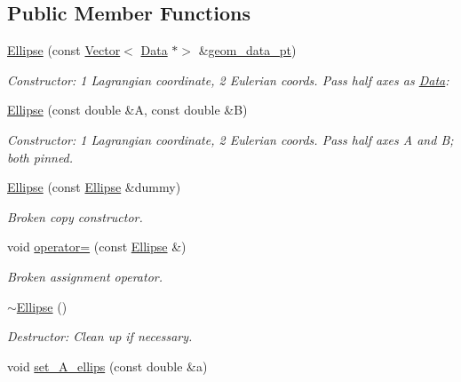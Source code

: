 \subsection*{Public Member Functions}
\begin{DoxyCompactItemize}
\item 
\hyperlink{classoomph_1_1Ellipse_a6fa5158011b34942ea014f8106e86786}{Ellipse} (const \hyperlink{classoomph_1_1Vector}{Vector}$<$ \hyperlink{classoomph_1_1Data}{Data} $\ast$$>$ \&\hyperlink{classoomph_1_1Ellipse_a99f443c61294d5cd12a1412a8a3b0b3e}{geom\+\_\+data\+\_\+pt})
\begin{DoxyCompactList}\small\item\em Constructor\+: 1 Lagrangian coordinate, 2 Eulerian coords. Pass half axes as \hyperlink{classoomph_1_1Data}{Data}\+: \end{DoxyCompactList}\item 
\hyperlink{classoomph_1_1Ellipse_a23a5b259b37d9e41af6a6755d3b944cd}{Ellipse} (const double \&A, const double \&B)
\begin{DoxyCompactList}\small\item\em Constructor\+: 1 Lagrangian coordinate, 2 Eulerian coords. Pass half axes A and B; both pinned. \end{DoxyCompactList}\item 
\hyperlink{classoomph_1_1Ellipse_a80738b07be639f57804a8618ddc8da66}{Ellipse} (const \hyperlink{classoomph_1_1Ellipse}{Ellipse} \&dummy)
\begin{DoxyCompactList}\small\item\em Broken copy constructor. \end{DoxyCompactList}\item 
void \hyperlink{classoomph_1_1Ellipse_ab757bc71f6ded401601095c62f751ba4}{operator=} (const \hyperlink{classoomph_1_1Ellipse}{Ellipse} \&)
\begin{DoxyCompactList}\small\item\em Broken assignment operator. \end{DoxyCompactList}\item 
\hyperlink{classoomph_1_1Ellipse_ac8b86537526fd611babf76e6df2271c7}{$\sim$\+Ellipse} ()
\begin{DoxyCompactList}\small\item\em Destructor\+: Clean up if necessary. \end{DoxyCompactList}\item 
void \hyperlink{classoomph_1_1Ellipse_a703231f987e418849146258eba183eb7}{set\+\_\+\+A\+\_\+ellips} (const double \&a)
$$
\end{DoxyCompactItemize}
